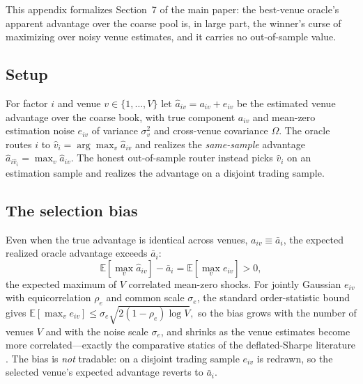 \documentclass[12pt]{article}
\theoremstyle{plain}
\theoremstyle{definition}
\newcommand{\E}{\mathbb{E}}
\begin{document}
This appendix formalizes Section~7 of the main paper: the best-venue oracle's
apparent advantage over the coarse pool is, in large part, the winner's curse of
maximizing over noisy venue estimates, and it carries no out-of-sample value.

\subsection*{Setup}
For factor $i$ and venue $v\in\{1,\dots,V\}$ let $\widehat a_{iv}=a_{iv}+e_{iv}$
be the estimated venue advantage over the coarse book, with true component
$a_{iv}$ and mean-zero estimation noise $e_{iv}$ of variance $\sigma^2_v$ and
cross-venue covariance $\Omega$. The oracle routes $i$ to
$\widehat v_i=\arg\max_v \widehat a_{iv}$ and realizes the \emph{same-sample}
advantage $\widehat a_{i\widehat v_i}=\max_v \widehat a_{iv}$. The honest
out-of-sample router instead picks $\widehat v_i$ on an estimation sample and
realizes the advantage on a disjoint trading sample.

\subsection*{The selection bias}
Even when the true advantage is identical across venues, $a_{iv}\equiv\bar a_i$,
the expected realized oracle advantage exceeds $\bar a_i$:
\begin{equation}
\E\!\left[\max_v \widehat a_{iv}\right]-\bar a_i
=\E\!\left[\max_v e_{iv}\right]>0 ,
\label{eq:wc}
\end{equation}
the expected maximum of $V$ correlated mean-zero shocks. For jointly Gaussian
$e_{iv}$ with equicorrelation $\rho_e$ and common scale $\sigma_e$, the standard
order-statistic bound gives
\(
\E[\max_v e_{iv}]\le \sigma_e\sqrt{2(1-\rho_e)\log V},
\)
so the bias grows with the number of venues $V$ and with the noise scale
$\sigma_e$, and shrinks as the venue estimates become more correlated---exactly
the comparative statics of the deflated-Sharpe literature
\citep{HarveyLiu2015,BaileyLopezdePrado2014}. The bias is \emph{not} tradable:
on a disjoint trading sample $e_{iv}$ is redrawn, so the selected venue's
expected advantage reverts to $\bar a_i$.
\end{document}
